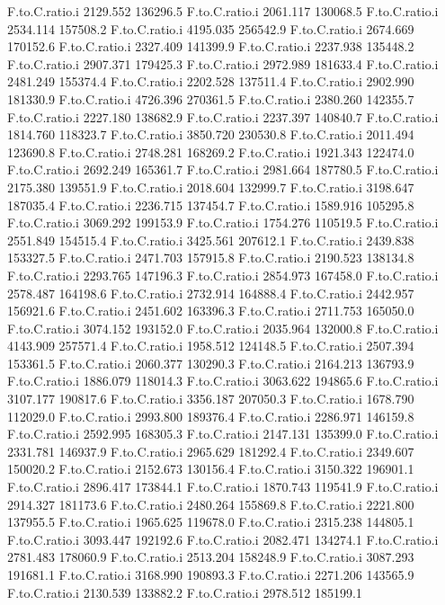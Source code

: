 \documentclass[11pt]{article} %
\begin{document}
\begin{Schunk}
\begin{Soutput}
F.to.C.ratio.i 2129.552 136296.5
F.to.C.ratio.i 2061.117 130068.5
F.to.C.ratio.i 2534.114 157508.2
F.to.C.ratio.i 4195.035 256542.9
F.to.C.ratio.i 2674.669 170152.6
F.to.C.ratio.i 2327.409 141399.9
F.to.C.ratio.i 2237.938 135448.2
F.to.C.ratio.i 2907.371 179425.3
F.to.C.ratio.i 2972.989 181633.4
F.to.C.ratio.i 2481.249 155374.4
F.to.C.ratio.i 2202.528 137511.4
F.to.C.ratio.i 2902.990 181330.9
F.to.C.ratio.i 4726.396 270361.5
F.to.C.ratio.i 2380.260 142355.7
F.to.C.ratio.i 2227.180 138682.9
F.to.C.ratio.i 2237.397 140840.7
F.to.C.ratio.i 1814.760 118323.7
F.to.C.ratio.i 3850.720 230530.8
F.to.C.ratio.i 2011.494 123690.8
F.to.C.ratio.i 2748.281 168269.2
F.to.C.ratio.i 1921.343 122474.0
F.to.C.ratio.i 2692.249 165361.7
F.to.C.ratio.i 2981.664 187780.5
F.to.C.ratio.i 2175.380 139551.9
F.to.C.ratio.i 2018.604 132999.7
F.to.C.ratio.i 3198.647 187035.4
F.to.C.ratio.i 2236.715 137454.7
F.to.C.ratio.i 1589.916 105295.8
F.to.C.ratio.i 3069.292 199153.9
F.to.C.ratio.i 1754.276 110519.5
F.to.C.ratio.i 2551.849 154515.4
F.to.C.ratio.i 3425.561 207612.1
F.to.C.ratio.i 2439.838 153327.5
F.to.C.ratio.i 2471.703 157915.8
F.to.C.ratio.i 2190.523 138134.8
F.to.C.ratio.i 2293.765 147196.3
F.to.C.ratio.i 2854.973 167458.0
F.to.C.ratio.i 2578.487 164198.6
F.to.C.ratio.i 2732.914 164888.4
F.to.C.ratio.i 2442.957 156921.6
F.to.C.ratio.i 2451.602 163396.3
F.to.C.ratio.i 2711.753 165050.0
F.to.C.ratio.i 3074.152 193152.0
F.to.C.ratio.i 2035.964 132000.8
F.to.C.ratio.i 4143.909 257571.4
F.to.C.ratio.i 1958.512 124148.5
F.to.C.ratio.i 2507.394 153361.5
F.to.C.ratio.i 2060.377 130290.3
F.to.C.ratio.i 2164.213 136793.9
F.to.C.ratio.i 1886.079 118014.3
F.to.C.ratio.i 3063.622 194865.6
F.to.C.ratio.i 3107.177 190817.6
F.to.C.ratio.i 3356.187 207050.3
F.to.C.ratio.i 1678.790 112029.0
F.to.C.ratio.i 2993.800 189376.4
F.to.C.ratio.i 2286.971 146159.8
F.to.C.ratio.i 2592.995 168305.3
F.to.C.ratio.i 2147.131 135399.0
F.to.C.ratio.i 2331.781 146937.9
F.to.C.ratio.i 2965.629 181292.4
F.to.C.ratio.i 2349.607 150020.2
F.to.C.ratio.i 2152.673 130156.4
F.to.C.ratio.i 3150.322 196901.1
F.to.C.ratio.i 2896.417 173844.1
F.to.C.ratio.i 1870.743 119541.9
F.to.C.ratio.i 2914.327 181173.6
F.to.C.ratio.i 2480.264 155869.8
F.to.C.ratio.i 2221.800 137955.5
F.to.C.ratio.i 1965.625 119678.0
F.to.C.ratio.i 2315.238 144805.1
F.to.C.ratio.i 3093.447 192192.6
F.to.C.ratio.i 2082.471 134274.1
F.to.C.ratio.i 2781.483 178060.9
F.to.C.ratio.i 2513.204 158248.9
F.to.C.ratio.i 3087.293 191681.1
F.to.C.ratio.i 3168.990 190893.3
F.to.C.ratio.i 2271.206 143565.9
F.to.C.ratio.i 2130.539 133882.2
F.to.C.ratio.i 2978.512 185199.1

\end{Soutput}
\end{Schunk}
\end{document}
